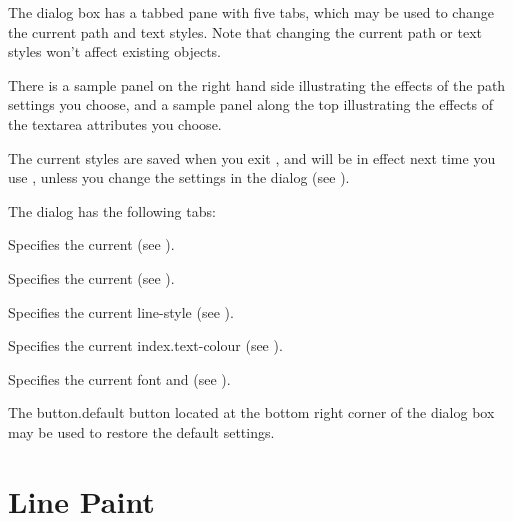 
The  dialog box has a tabbed pane with five tabs,
which may be used to change the current path and text styles.
Note that changing the current path or text styles won't affect
existing \glspl{object}. 

There is a sample panel on the right hand side illustrating the
effects of the \gls{path} settings you choose, and a sample panel along
the top illustrating the effects of the \gls*{textarea} attributes
you choose.

The current styles are saved when you exit \FlowframTk, and will be in
effect next time you use \FlowframTk, unless you change the 
 settings in the  dialog
(see ).

The  dialog has the following tabs:
\begin{deflist}
\begin{itemdesc}
Specifies the current  (see
).
\end{itemdesc}

\begin{itemdesc}
Specifies the current  (see
).
\end{itemdesc}

\begin{itemdesc}
Specifies the current \gls{line-style} (see
).
\end{itemdesc}

\begin{itemdesc}
Specifies the current \gls{index.text-colour} (see
).
\end{itemdesc}

\begin{itemdesc}
Specifies the current \gls{font} and  (see
).
\end{itemdesc}

\end{deflist}

The \gls{button.default} button located at the bottom right corner
of the dialog box may be used to restore the default settings.

\section{Line Paint}\label{sec:linepaint}

